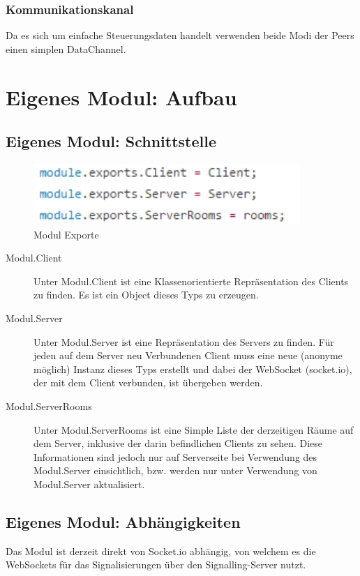 \subsubsection{Kommunikationskanal}
Da es sich um einfache Steuerungsdaten handelt verwenden beide Modi der Peers 
einen simplen DataChannel.



\section{Eigenes Modul: Aufbau}
\subsection{Eigenes Modul: Schnittstelle}
\begin{figure}[htH]
\centering
\includegraphics[width=0.9\textwidth]{backend/ModulExports.PNG}
\caption{Modul Exporte}
\label{backfig2}
\end{figure}

\begin{description}
\item[Modul.Client]
Unter Modul.Client ist eine Klassenorientierte Repräsentation des Clients zu 
finden. Es ist ein Object dieses Typs zu erzeugen.

\item[Modul.Server]
Unter Modul.Server ist eine Repräsentation des Servers zu finden. Für jeden auf 
dem Server neu Verbundenen Client muss eine neue (anonyme möglich) Instanz dieses Typs 
erstellt und dabei der WebSocket (socket.io), der mit dem Client verbunden, ist übergeben werden.

\item[Modul.ServerRooms]
Unter Modul.ServerRooms ist eine Simple Liste der derzeitigen Räume auf dem 
Server, inklusive der darin befindlichen Clients zu sehen. Diese Informationen 
sind jedoch nur auf Serverseite bei Verwendung des Modul.Server einsichtlich, 
bzw. werden nur unter Verwendung von Modul.Server aktualisiert.
\end{description}



\subsection{Eigenes Modul: Abhängigkeiten}
Das Modul ist derzeit direkt von Socket.io abhängig, von welchem es die 
WebSockets für das Signalisierungen über den Signalling-Server nutzt.



